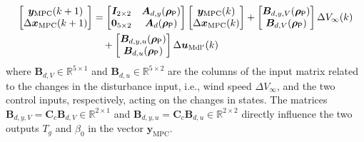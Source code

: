 \begin{equation*}
    \begin{aligned}
        \begin{bmatrix}
            \bm{y}_{\text{MPC}}(k+1) \\
            \Delta \bm{x}_{\text{MPC}}(k+1)
        \end{bmatrix} &= \begin{bmatrix}
            \bm{I}_{2\times2} & \bm{A}_{d,y}(\bm{\rho}_{\mathsf{P}}) \\
            \bm{0}_{5\times2} & \bm{A}_d(\bm{\rho}_{\mathsf{P}})
        \end{bmatrix}
        \begin{bmatrix}
            \bm{y}_{\text{MPC}}(k) \\
            \Delta \bm{x}_{\text{MPC}}(k)
        \end{bmatrix}
        +
        \begin{bmatrix}
            \bm{B}_{d,y,V}(\bm{\rho}_{\mathsf{P}}) \\
            \bm{B}_{d,V}(\bm{\rho}_{\mathsf{P}})
        \end{bmatrix} \Delta V_{\infty}(k) \\
        &\quad +
        \begin{bmatrix}
            \bm{B}_{d,y,u}(\bm{\rho}_{\mathsf{P}}) \\
            \bm{B}_{d,u}(\bm{\rho}_{\mathsf{P}})
        \end{bmatrix} \Delta \bm{u}_{\text{Mdl}^\prime}(k)
    \end{aligned}
\end{equation*}
where $\bm{B}_{d,V} \in \mathbb{R}^{5 \times 1}$ and $\bm{B}_{d,u} \in \mathbb{R}^{5 \times 2}$ are the columns of the input matrix related to the changes in the disturbance input, i.e., wind speed $\Delta V_{\infty}$, and the two control inputs, respectively, acting on the changes in states. The matrices $\bm{B}_{d,y,V} = \bm{C}_c\bm{B}_{d,V} \in \mathbb{R}^{2 \times 1}$ and $\bm{B}_{d,y,u} = \bm{C}_c\bm{B}_{d,u} \in \mathbb{R}^{2 \times 2}$ directly influence the two outputs $T_g$ and $\beta_0$ in the vector $\bm{y}_{\text{MPC}}$. 


